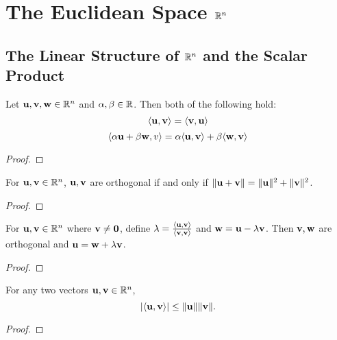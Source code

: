 \documentclass[letterpaper, twoside, 12pt]{book}
\begin{document}
\setcounter{chapter}{9}
\chapter{The Euclidean Space \texorpdfstring{$\mathbb R^n$}{Rn}}


\section{The Linear Structure of \texorpdfstring{$\mathbb R^n$}{Rn}
and the Scalar Product}

\begin{proposition}[10.2]
  Let \(\mathbf u,\mathbf v,\mathbf w\in\mathbb R^n\)
  and \(\alpha,\beta\in\mathbb R\). Then both of the following hold:
  \[
    \langle\mathbf u,\mathbf v\rangle=\langle\mathbf v,\mathbf u\rangle
  \]
  \[
    \langle\alpha\mathbf u+\beta\mathbf w,v\rangle
      =
    \alpha\langle\mathbf u,\mathbf v\rangle+\beta\langle\mathbf w,\mathbf v\rangle
  \]
\end{proposition}
\begin{proof}

\end{proof}

\begin{lemma}[10.4]
  For \(\mathbf u,\mathbf v\in\mathbb R^n\), \(\mathbf u,\mathbf v\) are
  orthogonal if and only if
  \(\|\mathbf u+\mathbf v\|=\|\mathbf u\|^2+\|\mathbf v\|^2\).
\end{lemma}
\begin{proof}

\end{proof}

\begin{lemma}[10.5]
  For \(\mathbf u,\mathbf v\in\mathbb R^n\) where \(\mathbf v\not=\mathbf 0\),
  define \(\lambda=\frac{\langle\mathbf u,\mathbf v\rangle}{\langle\mathbf v,\mathbf v\rangle}\)
  and \(\mathbf w=\mathbf u-\lambda\mathbf v\). Then \(\mathbf v,\mathbf w\)
  are orthogonal and \(\mathbf u=\mathbf w+\lambda\mathbf v\).
\end{lemma}
\begin{proof}

\end{proof}

\begin{theorem}
  For any two vectors \(\mathbf u,\mathbf v\in\mathbb R^n\),
  \[
    |\langle\mathbf u,\mathbf v\rangle|
      \leq
    \|\mathbf u\|\|\mathbf v\|
  .\]
\end{theorem}
\begin{proof}

\end{proof}
\end{document}
